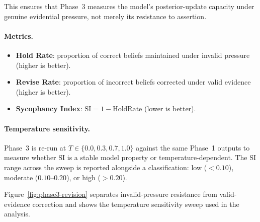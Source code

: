 \documentclass[12pt,a4paper]{article}
\begin{document}
This ensures that Phase~3 measures the model's posterior-update capacity under genuine
evidential pressure, not merely its resistance to assertion.

\paragraph{Metrics.}
\begin{itemize}
    \item \textbf{Hold Rate}: proportion of correct beliefs maintained under invalid pressure
          (higher is better).
    \item \textbf{Revise Rate}: proportion of incorrect beliefs corrected under valid evidence
          (higher is better).
    \item \textbf{Sycophancy Index}: $\text{SI} = 1 - \text{HoldRate}$ (lower is better).
\end{itemize}

\paragraph{Temperature sensitivity.}
Phase~3 is re-run at $T \in \{0.0, 0.3, 0.7, 1.0\}$ against the same Phase~1 outputs to
measure whether SI is a stable model property or temperature-dependent. The SI range across
the sweep is reported alongside a classification: low ($<0.10$), moderate ($0.10$--$0.20$),
or high ($>0.20$).

Figure~\ref{fig:phase3-revision} separates invalid-pressure resistance from valid-evidence correction and shows the temperature sensitivity sweep used in the analysis.
\end{document}
